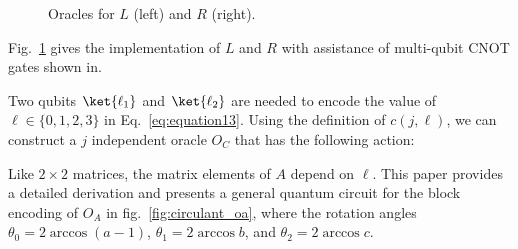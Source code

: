 \documentclass{article}
\begin{document}
\begin{figure}[htbp]
  \centering
  \caption{Oracles for $L$ (left) and $R$ (right).}
  \label{fig:circulant_lr}
\end{figure}

Fig.~\ref{fig:circulant_lr} gives the implementation of $L$ and $R$ with assistance of multi-qubit CNOT gates shown in.

Two qubits $\ket{\ell_1}$ and $\ket{\ell_2}$ are needed to encode the value of $\ell \in \{0,1,2,3\}$ in Eq.~\eqref{eq:equation13}. Using the definition of $c(j, \ell)$, we can construct a $j$ independent oracle $O_C$ that has the following action:

Like $2\times2$ matrices, the matrix elements of $A$ depend on $\ell$. This paper provides a detailed derivation and presents a general quantum circuit for the block encoding of $O_A$ in fig.~\ref{fig:circulant_oa}, where the rotation angles $\theta_0 = 2\arccos (a-1)$, $\theta_1 = 2\arccos b$, and $\theta_2 = 2\arccos c$.
\end{document}
